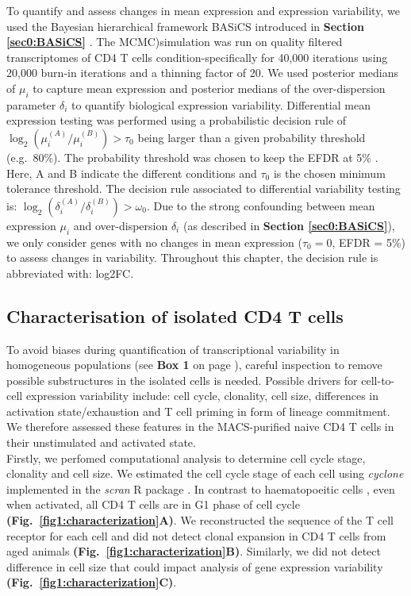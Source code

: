 To quantify and assess changes in mean expression and expression variability, we used the Bayesian hierarchical framework BASiCS introduced in \textbf{Section \ref{sec0:BASiCS}} \citep{Vallejos2015BASiCS, Vallejos2016}. The MCMC)simulation was run on quality filtered transcriptomes of CD4\plus{} T cells condition-specifically for 40,000 iterations using 20,000 burn-in iterations and a thinning factor of 20. We used posterior medians of $\mu_i$ to capture mean expression and posterior medians of the over-dispersion parameter $\delta_i$ to quantify biological expression variability. Differential mean expression testing was performed using a probabilistic decision rule of $\log_2(\mu_i^{(A)}/\mu_i^{(B)})>\tau_0$ being larger than a given probability threshold (e.g.~80\%). The probability threshold was chosen to keep the EFDR at 5\% \citep{Vallejos2016}. Here, A and B indicate the different conditions and $\tau_0$ is the chosen minimum tolerance threshold. The decision rule associated to differential variability testing is: $\log_2(\delta_i^{(A)}/\delta_i^{(B)})>\omega_0$. Due to the strong confounding between mean expression $\mu_i$ and over-dispersion $\delta_i$ (as described in \textbf{Section \ref{sec0:BASiCS}}), we only consider genes with no changes in mean expression ($\tau_0=0$, EFDR = 5\%) to assess changes in variability. Throughout this chapter, the decision rule is abbreviated with: \gls{log2FC}. 

\newpage

\subsection{Characterisation of isolated CD4\plus{} T cells}
\label{sec1:characterization}

To avoid biases during quantification of transcriptional variability in homogeneous populations (see \textbf{Box 1} on page \pageref{box1}), careful inspection to remove possible substructures in the isolated cells is needed. Possible drivers for cell-to-cell expression variability include: cell cycle, clonality, cell size, differences in activation state/exhaustion and T cell priming in form of lineage commitment. We therefore assessed these features in the MACS-purified naive CD4\plus{} T cells in their unstimulated and activated state.\\

Firstly, we perfomed computational analysis to determine cell cycle stage, clonality and cell size. We estimated the cell cycle stage of each cell using \emph{cyclone} \citep{Scialdone2015} implemented in the \emph{scran} R package \citep{Lun2016}. In contrast to haematopoeitic cells \citep{Kowalczyk2015}, even when activated, all CD4\plus{} T cells are in G1 phase of cell cycle \textbf{(Fig.~\ref{fig1:characterization}A)}. We reconstructed the sequence of the T cell receptor for each cell \citep{Stubbington2015} and did not detect clonal expansion in CD4\plus{} T cells from aged animals \textbf{(Fig.~\ref{fig1:characterization}B)}. Similarly, we did not detect difference in cell size that could impact analysis of gene expression variability \textbf{(Fig.~\ref{fig1:characterization}C)}. \\

